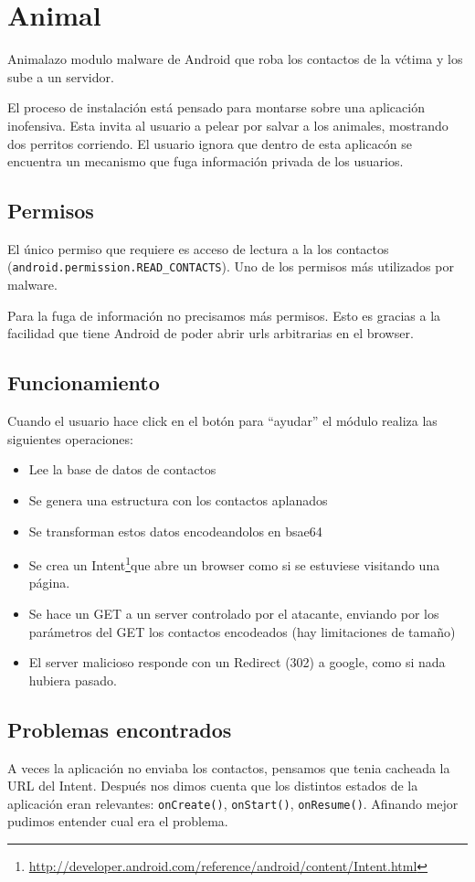 \section{Animal}
Animalazo modulo malware de Android que roba los contactos de la v\'ctima y los sube a un servidor.

El proceso de instalaci\'on est\'a pensado para montarse sobre una aplicaci\'on inofensiva.
Esta invita al usuario a pelear por salvar a los animales, mostrando dos perritos corriendo. El usuario ignora que dentro de esta aplicac\'on se encuentra un mecanismo que fuga informaci\'on privada de los usuarios.

\subsection{Permisos}

El \'unico permiso que requiere es acceso de lectura a la los contactos (\texttt{android.permission.READ\_CONTACTS}). Uno de los permisos m\'as utilizados por malware.

Para la fuga de informaci\'on no precisamos m\'as permisos. Esto es gracias a la facilidad que tiene Android de poder abrir urls arbitrarias en el browser.

\subsection{Funcionamiento}
Cuando el usuario hace click en el bot\'on para ``ayudar'' el m\'odulo realiza las siguientes operaciones:
\begin{itemize}
    \item Lee la base de datos de contactos
    \item Se genera una estructura con los contactos aplanados
    \item Se transforman estos datos encodeandolos en bsae64
    \item Se crea un Intent\footnote{\url{http://developer.android.com/reference/android/content/Intent.html}}que abre un browser como si se estuviese visitando una p\'agina.
    \item Se hace un GET a un server controlado por el atacante, enviando por los par\'ametros del GET los contactos encodeados (hay limitaciones de tama\~no)
    \item El server malicioso responde con un Redirect (302) a google, como si nada hubiera pasado.
\end{itemize}

\subsection{Problemas encontrados}
A veces la aplicaci\'on no enviaba los contactos, pensamos que tenia cacheada la URL del Intent. Despu\'es nos dimos cuenta que los distintos estados de la aplicaci\'on eran relevantes: \texttt{onCreate()}, \texttt{onStart()}, \texttt{onResume()}. Afinando mejor pudimos entender cual era el problema.

